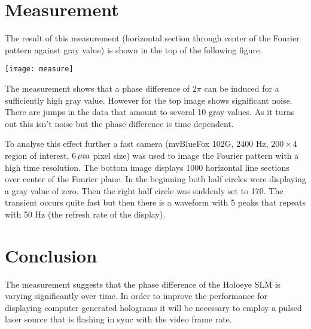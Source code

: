 \section{Measurement}
\label{sec-3}


The result of this measurement (horizontal section through center of
the Fourier pattern against gray value) is shown in the top of the
following figure.

\centerline{\texttt{[image: measure]}}


The measurement shows that a phase difference of $2\pi$ can be induced
for a sufficiently high gray value. However for the top image shows
significant noise. There are jumps in the data that amount to several
10 gray values. As it turns out this isn't noise but the phase
difference is time dependent.

To analyse this effect further a fast camera (mvBlueFox 102G, 2400 Hz,
$200\times4$ region of interest, $\unit[ 6]{\mu m}$ pixel size) was
used to image the Fourier pattern with a high time resolution.  The
bottom image displays 1000 horizontal line sections over center of the
Fourier plane. In the beginning both half circles were displaying a
gray value of zero. Then the right half circle was suddenly set
to 170. The transient occurs quite fast but then there is a waveform
with 5 peaks that repeats with 50 Hz (the refresh rate of the
display).


\section{Conclusion}
\label{sec-4}

The measurement suggests that the phase difference of the Holoeye SLM
is varying significantly over time. In order to improve the
performance for displaying computer generated holograms it will be
necessary to employ a pulsed laser source that is flashing in sync with
the video frame rate.

